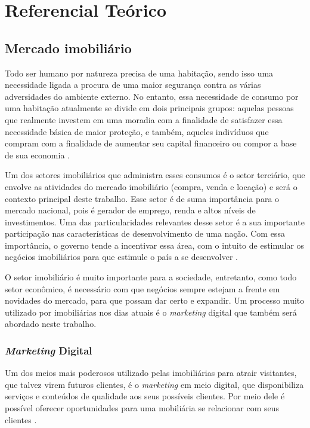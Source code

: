 \chapter{Referencial Teórico}

\section{Mercado imobiliário}

Todo ser humano por natureza precisa de uma habitação, sendo isso uma necessidade ligada a procura de uma maior segurança contra as várias adversidades do ambiente externo. No entanto, essa necessidade de consumo por uma habitação atualmente se divide em dois principais grupos: aquelas pessoas que realmente investem em uma moradia com a finalidade de satisfazer essa necessidade básica de maior proteção, e também, aqueles indivíduos que compram com a finalidade de aumentar seu capital financeiro ou compor a base de sua economia \cite{Arraes:2008}.

Um dos setores imobiliários que administra esses consumos é o setor terciário, que envolve as atividades do mercado imobiliário (compra, venda e locação) e será o contexto principal deste trabalho. Esse setor é de suma importância para o mercado nacional, pois é gerador de emprego, renda e altos níveis de investimentos. Uma das particularidades relevantes desse setor é a sua importante participação nas características de desenvolvimento de uma nação. Com essa importância, o governo tende a incentivar essa área, com o intuito de estimular os negócios imobiliários para que estimule o país a se desenvolver \cite{Correa:2018}.

O setor imobiliário é muito importante para a sociedade, entretanto, como todo setor econômico, é necessário com que negócios sempre estejam a frente em novidades do mercado, para que possam dar certo e expandir. Um processo muito utilizado por imobiliárias nos dias atuais é o \textit{marketing} digital que também será abordado neste trabalho.

\subsection{\textit{Marketing} Digital}

Um dos meios mais poderosos utilizado pelas imobiliárias para atrair visitantes, que talvez virem futuros clientes, é o \textit{marketing} em meio digital, que disponibiliza serviços e conteúdos de qualidade aos seus possíveis clientes. Por meio dele é possível oferecer oportunidades para uma mobiliária se relacionar com seus clientes \cite{Barreto:2019}.

